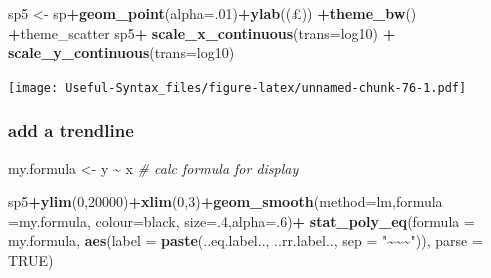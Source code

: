\documentclass[
]{article}
\newenvironment{Shaded}{\begin{snugshade}}{\end{snugshade}}
\newcommand{\AttributeTok}[1]{\textcolor[rgb]{0.13,0.29,0.53}{#1}}
\newcommand{\CommentTok}[1]{\textcolor[rgb]{0.56,0.35,0.01}{\textit{#1}}}
\newcommand{\ConstantTok}[1]{\textcolor[rgb]{0.56,0.35,0.01}{#1}}
\newcommand{\DecValTok}[1]{\textcolor[rgb]{0.00,0.00,0.81}{#1}}
\newcommand{\FunctionTok}[1]{\textcolor[rgb]{0.13,0.29,0.53}{\textbf{#1}}}
\newcommand{\NormalTok}[1]{#1}
\newcommand{\OtherTok}[1]{\textcolor[rgb]{0.56,0.35,0.01}{#1}}
\newcommand{\SpecialCharTok}[1]{\textcolor[rgb]{0.81,0.36,0.00}{\textbf{#1}}}
\newcommand{\StringTok}[1]{\textcolor[rgb]{0.31,0.60,0.02}{#1}}
\begin{document}
\begin{Shaded}
\begin{Highlighting}[]
\NormalTok{sp5 }\OtherTok{\textless{}{-}}\NormalTok{ sp}\SpecialCharTok{+}\FunctionTok{geom\_point}\NormalTok{(}\AttributeTok{alpha=}\NormalTok{.}\DecValTok{01}\NormalTok{)}\SpecialCharTok{+}\FunctionTok{ylab}\NormalTok{(}\StringTok{\textquotesingle{}(£)\textquotesingle{}}\NormalTok{) }\SpecialCharTok{+}\FunctionTok{theme\_bw}\NormalTok{() }\SpecialCharTok{+}\NormalTok{theme\_scatter}
\NormalTok{sp5}\SpecialCharTok{+} \FunctionTok{scale\_x\_continuous}\NormalTok{(}\AttributeTok{trans=}\StringTok{\textquotesingle{}log10\textquotesingle{}}\NormalTok{) }\SpecialCharTok{+}
  \FunctionTok{scale\_y\_continuous}\NormalTok{(}\AttributeTok{trans=}\StringTok{\textquotesingle{}log10\textquotesingle{}}\NormalTok{)}
\end{Highlighting}
\end{Shaded}

\texttt{[image: Useful-Syntax\_files/figure-latex/unnamed-chunk-76-1.pdf]}

\hypertarget{add-a-trendline}{%
\subsubsection{add a trendline}\label{add-a-trendline}}

\begin{Shaded}
\begin{Highlighting}[]
\NormalTok{my.formula }\OtherTok{\textless{}{-}}\NormalTok{ y }\SpecialCharTok{\textasciitilde{}}\NormalTok{ x }\CommentTok{\# calc formula for display}

\NormalTok{sp5}\SpecialCharTok{+}\FunctionTok{ylim}\NormalTok{(}\DecValTok{0}\NormalTok{,}\DecValTok{20000}\NormalTok{)}\SpecialCharTok{+}\FunctionTok{xlim}\NormalTok{(}\DecValTok{0}\NormalTok{,}\DecValTok{3}\NormalTok{)}\SpecialCharTok{+}\FunctionTok{geom\_smooth}\NormalTok{(}\AttributeTok{method=}\StringTok{\textquotesingle{}lm\textquotesingle{}}\NormalTok{,}\AttributeTok{formula =}\NormalTok{my.formula,}
                                        \AttributeTok{colour=}\StringTok{\textquotesingle{}black\textquotesingle{}}\NormalTok{, }\AttributeTok{size=}\NormalTok{.}\DecValTok{4}\NormalTok{,}\AttributeTok{alpha=}\NormalTok{.}\DecValTok{6}\NormalTok{)}\SpecialCharTok{+}
  \FunctionTok{stat\_poly\_eq}\NormalTok{(}\AttributeTok{formula =}\NormalTok{ my.formula,}
               \FunctionTok{aes}\NormalTok{(}\AttributeTok{label =} \FunctionTok{paste}\NormalTok{(..eq.label.., ..rr.label..,}
                                                        \AttributeTok{sep =} \StringTok{"\textasciitilde{}\textasciitilde{}\textasciitilde{}"}\NormalTok{)), }\AttributeTok{parse =} \ConstantTok{TRUE}\NormalTok{)}
\end{Highlighting}
\end{Shaded}
\end{document}
